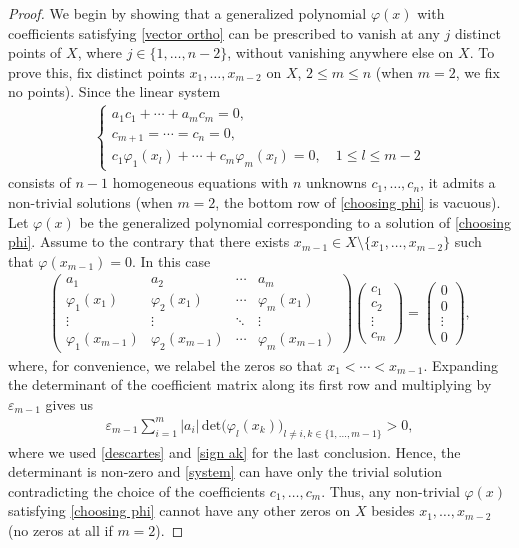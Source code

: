 \documentclass[twoside,a4paper]{amsart}
\renewcommand{\det}{\mathrm{det}}
\theoremstyle{remark}
\begin{document}
\begin{proof}
We begin by showing  that a generalized polynomial \( \varphi(x) \) with coefficients satisfying \eqref{vector ortho} can be prescribed to vanish at any  $j$ distinct points of $X$, where \(j\in\{1,\ldots, n-2\} \), without vanishing anywhere else on $X$. To prove this, fix distinct points \( x_1,\ldots,x_{m-2} \) on \( X \), \(  2\leq m\leq n \) (when \(m=2\), we fix no points). Since the linear system 
\begin{align}
\label{choosing phi}
\begin{cases}
a_1c_1 + \cdots + a_mc_m =0, \\ 
c_{m+1} = \cdots = c_n =0, \\
c_1\varphi_1(x_l) + \cdots + c_m\varphi_m(x_l) =0, \quad 1\leq l\leq m-2
\end{cases}
\end{align}
consists of $n-1$ homogeneous equations with $n$ unknowns $c_1,\ldots,c_n$, it admits a non-trivial solutions (when \( m=2\), the bottom row of \eqref{choosing phi} is vacuous). Let \( \varphi(x) \) be the generalized polynomial corresponding to a solution of \eqref{choosing phi}. Assume to the contrary that there exists \( x_{m-1} \in X\setminus\{x_1,\ldots,x_{m-2} \} \) such that \(\varphi(x_{m-1})=0 \). In this case
\begin{align}
\label{system}
\begin{pmatrix}
a_1 & a_2 & \cdots & a_m \\
\varphi_1(x_1) & \varphi_2(x_1) & \cdots & \varphi_m(x_1) \\
\vdots & \vdots & \ddots & \vdots \\
\varphi_1(x_{m-1}) & \varphi_2(x_{m-1}) & \cdots & \varphi_m(x_{m-1})
\end{pmatrix} 
\begin{pmatrix}
c_1 \\ c_2 \\ \vdots \\ c_m    
\end{pmatrix}
= \begin{pmatrix}
0 \\ 0 \\ \vdots \\ 0    
\end{pmatrix},
\end{align}
where, for convenience, we relabel the zeros so that \( x_1<\cdots<x_{m-1} \).  Expanding the determinant of the coefficient matrix along its first row and  multiplying by \( \varepsilon_{m-1} \) gives us
\begin{align}
\label{contradiction}
\varepsilon_{m-1}\sum_{i=1}^m |a_i| \, \det \big(\varphi_l(x_k)\big)_{l\neq i,k\in \{1,\ldots,m-1\}}>0,    
\end{align}
where we used \eqref{descartes} and \eqref{sign ak} for the last conclusion. Hence, the determinant is non-zero and \eqref{system} can have only the trivial solution contradicting the choice of the coefficients $c_1,\ldots,c_m$.  Thus, any non-trivial \( \varphi(x) \) satisfying \eqref{choosing phi} cannot have any other zeros on $X$ besides $x_1,\ldots,x_{m-2}$ (no zeros at all if \( m=2\)).


\end{proof}
\end{document}
